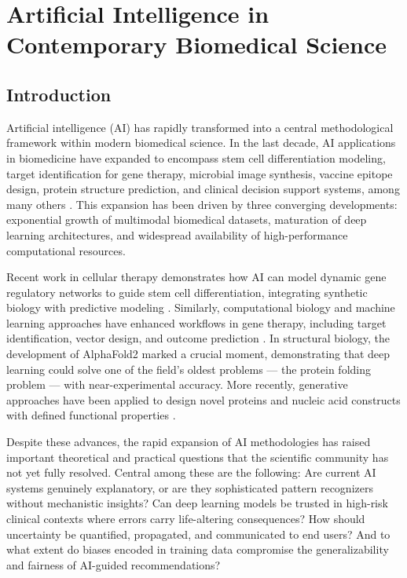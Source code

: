 \chapter{Artificial Intelligence in Contemporary Biomedical Science}

\section{Introduction}

Artificial intelligence (AI) has rapidly transformed into a central methodological framework within modern biomedical science. In the last decade, AI applications in biomedicine have expanded to encompass stem cell differentiation modeling, target identification for gene therapy, microbial image synthesis, vaccine epitope design, protein structure prediction, and clinical decision support systems, among many others \parencite{topol2019, jumper2021}. This expansion has been driven by three converging developments: exponential growth of multimodal biomedical datasets, maturation of deep learning architectures, and widespread availability of high-performance computational resources.

Recent work in cellular therapy demonstrates how AI can model dynamic gene regulatory networks to guide stem cell differentiation, integrating synthetic biology with predictive modeling \parencite{choudhury2025}. Similarly, computational biology and machine learning approaches have enhanced workflows in gene therapy, including target identification, vector design, and outcome prediction \parencite{danaeifar2025}. In structural biology, the development of AlphaFold2 \parencite{jumper2021} marked a crucial moment, demonstrating that deep learning could solve one of the field's oldest problems --- the protein folding problem --- with near-experimental accuracy. More recently, generative approaches have been applied to design novel proteins and nucleic acid constructs with defined functional properties \parencite{ferruz2022}.

Despite these advances, the rapid expansion of AI methodologies has raised important theoretical and practical questions that the scientific community has not yet fully resolved. Central among these are the following: Are current AI systems genuinely explanatory, or are they sophisticated pattern recognizers without mechanistic insights? Can deep learning models be trusted in high-risk clinical contexts where errors carry life-altering consequences? How should uncertainty be quantified, propagated, and communicated to end users? And to what extent do biases encoded in training data compromise the generalizability and fairness of AI-guided recommendations?

